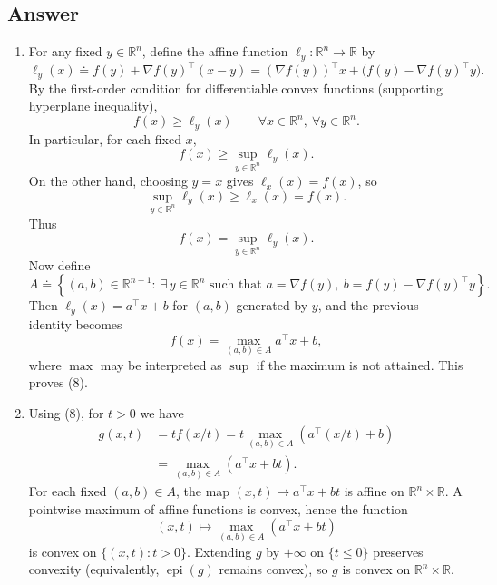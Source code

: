 \documentclass[
  12pt,
]{fphw}
\begin{document}
\subsection*{Answer}
\begin{enumerate}
\item[(a)] For any fixed $y\in\mathbb{R}^n$, define the affine function $\ell_y:\mathbb{R}^n\to\mathbb{R}$ by
\[
\ell_y(x) \doteq f(y) + \nabla f(y)^\top (x-y)
= (\nabla f(y))^\top x + \big(f(y)-\nabla f(y)^\top y\big).
\]
By the first-order condition for differentiable convex functions (supporting hyperplane inequality),
\[
f(x)\ge \ell_y(x)\qquad \forall x\in\mathbb{R}^n,\ \forall y\in\mathbb{R}^n. \tag{*}
\]
In particular, for each fixed $x$,
\[
f(x)\ge \sup_{y\in\mathbb{R}^n} \ell_y(x).
\]
On the other hand, choosing $y=x$ gives $\ell_x(x)=f(x)$, so
\[
\sup_{y\in\mathbb{R}^n}\ell_y(x)\ge \ell_x(x)=f(x).
\]
Thus
\[
f(x)=\sup_{y\in\mathbb{R}^n}\ell_y(x).
\]
Now define
\[
A \doteq \left\{(a,b)\in\mathbb{R}^{n+1}:\ \exists\,y\in\mathbb{R}^n \text{ such that } a=\nabla f(y),\ b=f(y)-\nabla f(y)^\top y\right\}.
\]
Then $\ell_y(x)=a^\top x+b$ for $(a,b)$ generated by $y$, and the previous identity becomes
\[
f(x)=\max_{(a,b)\in A} a^\top x+b,
\]
where $\max$ may be interpreted as $\sup$ if the maximum is not attained. This proves (8).

\item[(b)] Using (8), for $t>0$ we have
\begin{align*}
g(x,t)
&= t f(x/t)
= t \max_{(a,b)\in A}\left(a^\top (x/t)+b\right) \\
&= \max_{(a,b)\in A}\left( a^\top x + bt \right).
\end{align*}
For each fixed $(a,b)\in A$, the map $(x,t)\mapsto a^\top x+bt$ is affine on $\mathbb{R}^n\times\mathbb{R}$.
A pointwise maximum of affine functions is convex, hence the function
\[
(x,t)\mapsto \max_{(a,b)\in A}(a^\top x+bt)
\]
is convex on $\{(x,t):t>0\}$. Extending $g$ by $+\infty$ on $\{t\le 0\}$ preserves convexity (equivalently, $\operatorname{epi}(g)$ remains convex),
so $g$ is convex on $\mathbb{R}^n\times\mathbb{R}$.


\end{enumerate}
\end{document}
